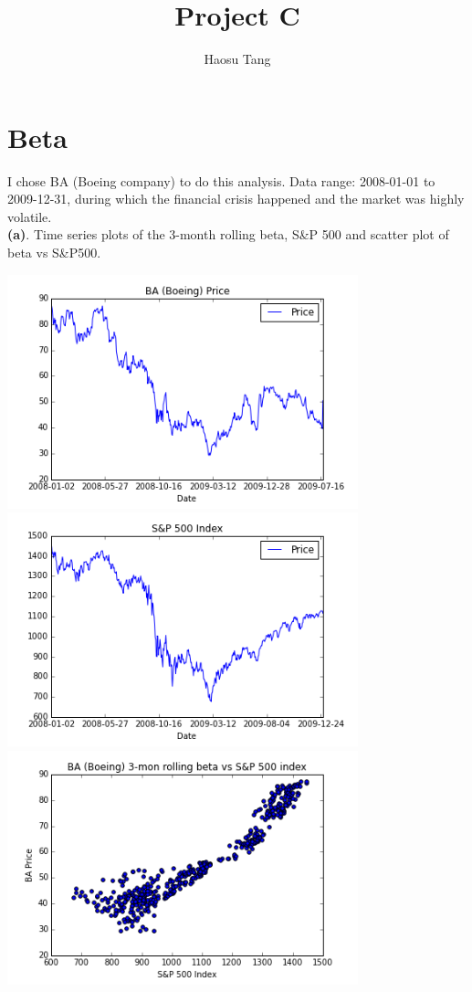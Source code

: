 \documentclass[11pt,letter]{article}
\author{Haosu Tang}
\title{Project C}
\begin{document}
\maketitle

\section{Beta}
I chose BA (Boeing company) to do this analysis. Data range: 2008-01-01 to 2009-12-31, during which the financial crisis happened and the market was highly volatile.\\

\textbf{(a)}. Time series plots of the 3-month rolling beta, S\&P 500 and scatter plot of beta vs S\&P500.
\begin{center}
\includegraphics[width=4in,keepaspectratio]{1aBA}
\includegraphics[width=4in,keepaspectratio]{1aSP}
\includegraphics[width=4in,keepaspectratio]{1aBASPscatter}
\end{center}
\end{document}
